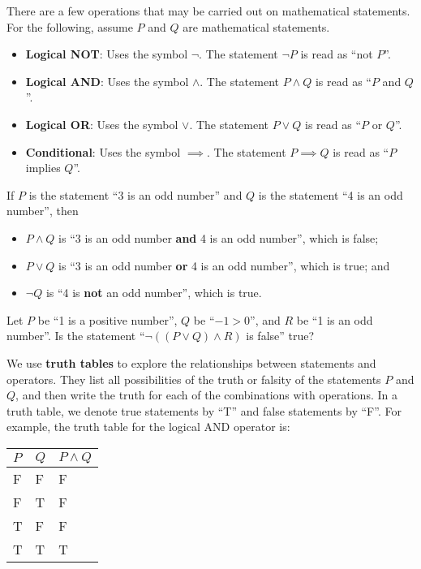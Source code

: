 There are a few operations that may be carried out on mathematical statements. For the following, assume $P$ and $Q$ are mathematical statements.
\begin{itemize}
    \item \textbf{Logical NOT}: Uses the symbol $\lnot$. The statement $\lnot P$ is read as ``not $P$''.
    \item \textbf{Logical AND}: Uses the symbol $\land$. The statement $P\land Q$ is read as ``$P$ and $Q$''.
    \item \textbf{Logical OR}: Uses the symbol $\lor$. The statement $P\lor Q$ is read as ``$P$ or $Q$''.
    \item \textbf{Conditional}: Uses the symbol $\implies$. The statement $P \implies Q$ is read as ``$P$ implies $Q$''.  
\end{itemize}
\begin{example}
    If $P$ is the statement ``3 is an odd number'' and $Q$ is the statement ``4 is an odd number'', then
    \begin{itemize}
        \item $P\land Q$ is ``3 is an odd number \textbf{and} 4 is an odd number'', which is false;
        \item $P\lor Q$ is ``3 is an odd number \textbf{or} 4 is an odd number'', which is true; and
        \item $\lnot Q$ is ``4 is \textbf{not} an odd number'', which is true.
    \end{itemize}
\end{example}
\begin{exercise}
    Let $P$ be ``1 is a positive number'', $Q$ be ``$-1 > 0$'', and $R$ be ``1 is an odd number''. Is the statement ``$\lnot((P\lor Q)\land R)$ is false'' true?
\end{exercise}

We use \textbf{truth tables} to explore the relationships between statements and operators. They list all possibilities of the truth or falsity of the statements $P$ and $Q$, and then write the truth for each of the combinations with operations. In a truth table, we denote true statements by ``T'' and false statements by ``F''. For example, the truth table for the logical AND operator is:
\begin{table}[h]
    \centering
    \begin{tabular}{|l|l||l|}
        \hline
        $P$ & $Q$ & $P\land Q$ \\ \hline
        F   & F   & F          \\ \hline
        F   & T   & F          \\ \hline
        T   & F   & F          \\ \hline
        T   & T   & T          \\ \hline
    \end{tabular}
\end{table}

